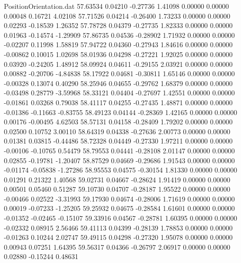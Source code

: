 \begin{filecontents}{PositionOrientation.dat}
  57.63534    0.04210   -0.27736     1.41098    0.00000    0.00000    0.00048    0.16721    4.02108
  57.71526    0.04214   -0.26400     1.73233    0.00000    0.00000    0.02293   -0.18539    1.26352
  57.78728    0.04379   -0.27735     1.82333    0.00000    0.00000    0.01963   -0.14574   -1.29909
  57.86735    0.04536   -0.28902     1.71932    0.00000    0.00000   -0.02207    0.11998    1.58819
  57.94722    0.04360   -0.27943     1.84616    0.00000    0.00000   -0.00862    0.10015    1.02698
  58.01936    0.04298   -0.27221     1.92025    0.00000    0.00000    0.03920   -0.24205    1.48912
  58.09924    0.04611   -0.29155     2.03921    0.00000    0.00000    0.00882   -0.20706   -4.84838
  58.17922    0.04681   -0.30811     1.65146    0.00000    0.00000   -0.00328    0.13074    0.40290
  58.25946    0.04655   -0.29762     1.68379    0.00000    0.00000   -0.03498    0.28779   -3.59968
  58.33121    0.04404   -0.27697     1.42551    0.00000    0.00000   -0.01861    0.03268    0.79038
  58.41117    0.04255   -0.27435     1.48871    0.00000    0.00000   -0.01386   -0.11663   -0.83755
  58.49123    0.04144   -0.28369     1.42165    0.00000    0.00000    0.00176   -0.00495    4.62503
  58.57131    0.04158   -0.28409     1.79202    0.00000    0.00000    0.02500    0.10752    3.00110
  58.64319    0.04338   -0.27636     2.00773    0.00000    0.00000    0.01381    0.03815   -0.44486
  58.72328    0.04449   -0.27330     1.97211    0.00000    0.00000   -0.00106   -0.10765    0.54479
  58.79553    0.04441   -0.28108     2.01147    0.00000    0.00000    0.02855   -0.19781   -1.20407
  58.87529    0.04669   -0.29686     1.91543    0.00000    0.00000   -0.01174   -0.05838   -1.27286
  58.95553    0.04575   -0.30154     1.81330    0.00000    0.00000    0.01291    0.21322    1.40568
  59.02731    0.04667   -0.28624     1.91419    0.00000    0.00000    0.00501    0.05460    0.51287
  59.10730    0.04707   -0.28187     1.95522    0.00000    0.00000   -0.00466    0.02522   -3.31993
  59.17930    0.04674   -0.28006     1.71619    0.00000    0.00000    0.00019   -0.07233   -1.25205
  59.25932    0.04675   -0.28584     1.61601    0.00000    0.00000   -0.01352   -0.02465   -0.15107
  59.33916    0.04567   -0.28781     1.60395    0.00000    0.00000   -0.02332    0.08915    2.56466
  59.41113    0.04399   -0.28139     1.78853    0.00000    0.00000   -0.01263    0.10244    2.02747
  59.49115    0.04298   -0.27320     1.95078    0.00000    0.00000    0.00943    0.07251    1.64395
  59.56317    0.04366   -0.26797     2.06917    0.00000    0.00000    0.02880   -0.15244    0.48631

\end{filecontents}
